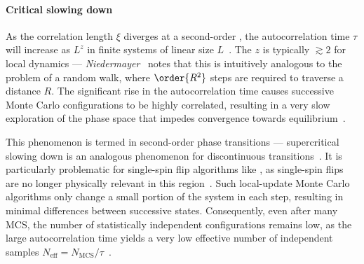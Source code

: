 \paragraph{Critical slowing down}
As the correlation length $\xi$ diverges at a second-order , the autocorrelation time $\tau$ will increase as $L^z$ in finite systems of linear size $L$~\cite{NumericalDynamicalNiedermayer}.
The  $z$ is typically $\gtrsim 2$ for local dynamics --- \textit{Niedermayer}~\cite{niedermayer1988general} notes that this is intuitively analogous to the problem of a random walk, where $\order{R^2}$ steps are required to traverse a distance $R$.
The significant rise in the autocorrelation time causes successive Monte Carlo configurations to be highly correlated, resulting in a very slow exploration of the phase space that impedes convergence towards equilibrium~\cite{NumericalDynamicalNiedermayer,CompStatPhys,StatisticalMechanicsAlgorithmsComputations}. \par
This phenomenon is termed  in second-order phase transitions --- supercritical slowing down is an analogous phenomenon for discontinuous transitions~\cite{PhD_Reynal}.
It is particularly problematic for single-spin flip algorithms like , as single-spin flips are no longer physically relevant in this region~\cite{PhD_Reynal}.
Such local-update Monte Carlo algorithms only change a small portion of the system in each step, resulting in minimal differences between successive states.
Consequently, even after many MCS, the number of statistically independent configurations remains low, as the large autocorrelation time yields a very low effective number of independent samples $N_\mathrm{eff} = N_\mathrm{MCS}/\tau$~\cite{niedermayer1988general,BeatCriticalSlowingDown1990}. \par

